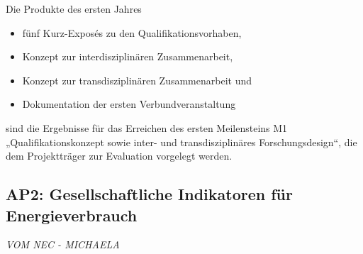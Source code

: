 \documentclass[a4paper,11pt,twoside]{scrartcl}
\begin{document}
Die Produkte des ersten Jahres
\begin{itemize}
    \item fünf Kurz-Exposés zu den Qualifikationsvorhaben, 
    \item Konzept zur interdisziplinären Zusammenarbeit,
    \item Konzept zur transdisziplinären Zusammenarbeit und
    \item Dokumentation der ersten Verbundveranstaltung 
\end{itemize}
sind die Ergebnisse für das Erreichen des ersten Meilensteins M1 „Qualifikationskonzept sowie inter- und transdisziplinäres Forschungsdesign“, die dem Projektträger zur Evaluation vorgelegt werden.

\subsection*{AP2: Gesellschaftliche Indikatoren für Energieverbrauch}
\textit{VOM NEC - MICHAELA}
\end{document}
